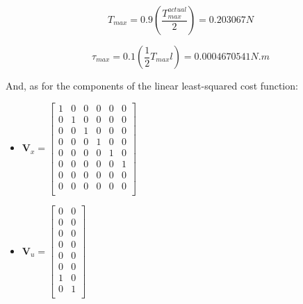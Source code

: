 \documentclass{thesisreport}
\begin{document}
	\begin{equation}
		T_{max} = 0.9 (\frac{T_{max}^{actual}}{2})=0.203067N
	\end{equation}
	
	\begin{equation}
		\tau_{max} = 0.1(\frac{1}{2}T_{max}l)=0.0004670541N.m
	\end{equation}

And, as for the components of the linear least-squared cost function:

\begin{multicols}{2}
        \begin{itemize}
                \item $\bm{V}_x = \begin{bmatrix}
                1 & 0 & 0 & 0 & 0 & 0 \\
                0 & 1 & 0 & 0 & 0 & 0 \\
                0 & 0 & 1 & 0 & 0 & 0 \\
                0 & 0 & 0 & 1 & 0 & 0 \\
                0 & 0 & 0 & 0 & 1 & 0 \\
                0 & 0 & 0 & 0 & 0 & 1 \\
                0 & 0 & 0 & 0 & 0 & 0 \\
                0 & 0 & 0 & 0 & 0 & 0 \\
                \end{bmatrix}$
                
                
                
            \end{itemize}
			\columnbreak
            \begin{itemize}
            
            	\item $\bm{V}_u = \begin{bmatrix}
                0 & 0 \\
                0 & 0 \\
                0 & 0 \\
                0 & 0 \\
                0 & 0 \\
                0 & 0 \\
                1 & 0 \\
                0 & 1 \\
                \end{bmatrix}$
            	\end{itemize}
                \end{multicols}
                
\end{document}
